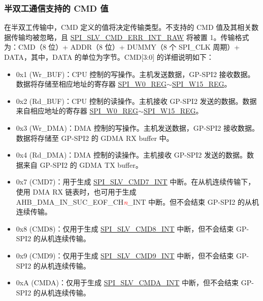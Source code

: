 \documentclass[main\_\_CN.tex]{subfiles}
\begin{document}
\subsubsection{半双工通信支持的 CMD 值} \label{GP-SPI2 HD salve format}  

在半双工传输中，CMD 定义的值将决定传输类型。不支持的 CMD 值及其相关数据传输均被忽略，且 \hyperref[fielddesc:SPISLVCMDERRINTRAW]{SPI\_SLV\_CMD\_ERR\_INT\_RAW} 将被置 1。传输格式为：CMD（8 位）+ ADDR（8 位）+ DUMMY（8 个 SPI\_CLK 周期）+ DATA，其中，DATA 的单位为字节。CMD[3:0] 的详细说明如下：


\begin{itemize}
    \item \label{cmd:wrbuf} 0x1 (Wr\_BUF)：CPU 控制的写操作。主机发送数据，GP-SPI2 接收数据。数据将存储至相应地址的寄存器 \hyperref[regdesc:SPIW0REG]{SPI\_W0\_REG}$\sim$\hyperref[regdesc:SPIW15REG]{SPI\_W15\_REG}。 
    
    \item \label{cmd:rdbuf} 0x2 (Rd\_BUF)：CPU 控制的读操作。主机接收 GP-SPI2 发送的数据。数据来自相应地址的寄存器 \hyperref[regdesc:SPIW0REG]{SPI\_W0\_REG}$\sim$\hyperref[regdesc:SPIW15REG]{SPI\_W15\_REG}。    
    
    \item \label{cmd:wrdma} 0x3 (Wr\_DMA)：DMA 控制的写操作。主机发送数据，GP-SPI2 接收数据。数据将存储至 GP-SPI2 的 GDMA RX buffer 中。
    
    \item \label{cmd:rddma} 0x4 (Rd\_DMA)：DMA 控制的读操作。主机接收 GP-SPI2 发送的数据。数据来自 GP-SPI2 的 GDMA TX buffer。
    
    \item \label{cmd:CMD7} 0x7 (CMD7)：用于生成 \hyperref[int:SPISLVCMD7INT]{SPI\_SLV\_CMD7\_INT} 中断。在从机连续传输下，使用 DMA RX 链表时，也可用于生成 AHB\_DMA\_IN\_SUC\_EOF\_CH\textcolor{red}{\it{n}}\_INT 中断。但不会结束 GP-SPI2 的从机连续传输。
    
    \item 0x8 (CMD8)：仅用于生成 \hyperref[int:SPISLVCMD8INT]{SPI\_SLV\_CMD8\_INT} 中断，但不会结束 GP-SPI2 的从机连续传输。

    \item 0x9 (CMD9)：仅用于生成 \hyperref[int:SPISLVCMD9INT]{SPI\_SLV\_CMD9\_INT} 中断，但不会结束 GP-SPI2 的从机连续传输。
    
    \item 0xA (CMDA)：仅用于生成 \hyperref[int:SPISLVCMDAINT]{SPI\_SLV\_CMDA\_INT} 中断，但不会结束 GP-SPI2 的从机连续传输。
    
\end{itemize}
\end{document}
